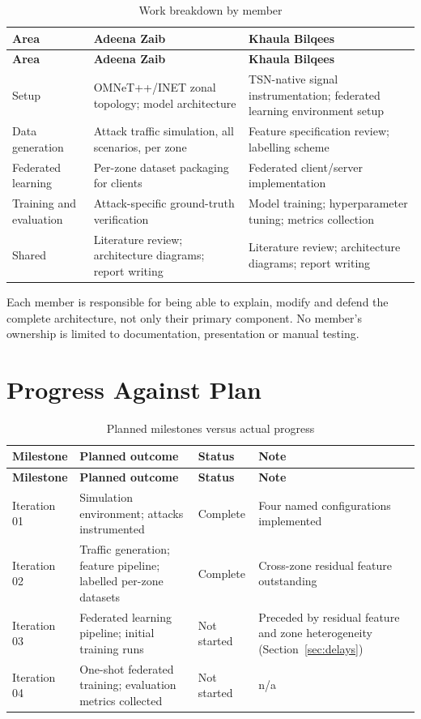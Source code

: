 \begin{longtable}{p{} p{} p{}}
\caption{Work breakdown by member}\label{tab:workbreakdown}\\
\toprule
\textbf{Area} & \textbf{Adeena Zaib} & \textbf{Khaula Bilqees} \\
\midrule
\endfirsthead
\toprule
\textbf{Area} & \textbf{Adeena Zaib} & \textbf{Khaula Bilqees} \\
\midrule
\endhead
Setup &
OMNeT++/INET zonal topology; model architecture &
TSN-native signal instrumentation; federated learning environment setup \\
\addlinespace
Data generation &
Attack traffic simulation, all scenarios, per zone &
Feature specification review; labelling scheme \\
\addlinespace
Federated learning &
Per-zone dataset packaging for clients &
Federated client/server implementation \\
\addlinespace
Training and evaluation &
Attack-specific ground-truth verification &
Model training; hyperparameter tuning; metrics collection \\
\addlinespace
Shared &
Literature review; architecture diagrams; report writing &
Literature review; architecture diagrams; report writing \\
\bottomrule
\end{longtable}


Each member is responsible for being able to explain, modify and defend the complete
architecture, not only their primary component. No member's ownership is limited to
documentation, presentation or manual testing.

\section{Progress Against Plan}
\label{sec:progress}

\begin{longtable}{p{} p{} p{} p{}}
\caption{Planned milestones versus actual progress}\\
\toprule
\textbf{Milestone} & \textbf{Planned outcome} & \textbf{Status} & \textbf{Note} \\
\midrule
\endfirsthead
\toprule
\textbf{Milestone} & \textbf{Planned outcome} & \textbf{Status} & \textbf{Note} \\
\midrule
\endhead
Iteration 01 & Simulation environment; attacks instrumented & Complete & Four named
configurations implemented \\
Iteration 02 & Traffic generation; feature pipeline; labelled per-zone datasets &
Complete & Cross-zone residual feature outstanding \\
Iteration 03 & Federated learning pipeline; initial training runs & Not started &
Preceded by residual feature and zone heterogeneity (Section~\ref{sec:delays}) \\
Iteration 04 & One-shot federated training; evaluation metrics collected & Not started & n/a \\
\bottomrule
\end{longtable}


